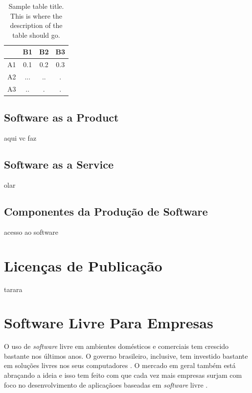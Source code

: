 \documentclass{classe_cn}                 %
\begin{document}
\begin{table}[h!]
\label{tag_tabela_01}
\caption{Sample table title. This is where the description of the table should go.}
  \begin{tabular}{cccc}
  \hline
       & B1   & B2   & B3   \\ \hline
   A1  & 0.1  & 0.2  & 0.3  \\
   A2  & ...  & ..   & .    \\
   A3  & ..   & .    & .    \\ \hline
  \end{tabular}
\end{table}

\subsection{Software as a Product}

aqui vc faz

\subsection{Software as a Service}

olar

\subsection{Componentes da Produção de Software}

acesso ao software

\section{Licenças de Publicação}

tarara

\section{Software Livre Para Empresas}

O uso de \textit{software} livre em ambientes domésticos e comerciais tem crescido bastante nos últimos anos. O governo brasileiro, inclusive, tem investido bastante em soluções livres nos seus computadores \cite{Jose:2016}. O mercado em geral também está abraçando a ideia e isso tem feito com que cada vez mais empresas surjam com foco no desenvolvimento de aplicaçãoes baseadas em \textit{software} livre \cite{Hecker:2016}.
\end{document}
